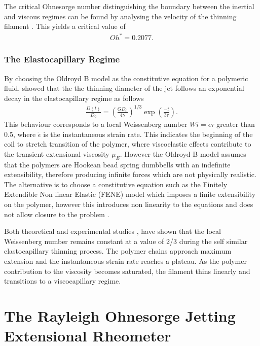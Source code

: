 \documentclass[11pt]{article}
\begin{document}
The critical Ohnesorge number distinguishing the boundary between the inertial and viscous regimes can be found by analysing the velocity of the thinning filament \cite{campo2010slow}. This yields a critical value of
\begin{align*}
Oh^* = 0.2077.
\end{align*}

\subsubsection{The Elastocapillary Regime} \label{sec:elasto}
By choosing the Oldroyd B model as the constitutive equation for a polymeric fluid, \cite{bazilevsky1990liquid} showed that the the thinning diameter of the jet follows an exponential decay in the elastocapillary regime as follows
\begin{align}
\frac{D(t)}{D_0} = \left(\frac{G D_0}{4 \gamma}\right)^{1/3} \exp \left(\frac{-t}{3 \tau}\right).
\label{eqn:elasto_thinning}
\end{align}
This behaviour corresponds to a local Weissenberg number $Wi = \dot{\epsilon} \tau$ greater than 0.5, where $\dot{\epsilon}$ is the instantaneous strain rate. This indicates the beginning of the coil to stretch transition of the polymer, where viscoelastic effects contribute to the transient extensional viscosity $\mu_E$. However the Oldroyd B model assumes that the polymers are Hookean bead spring dumbbells with an indefinite extensibility, therefore producing infinite forces which are not physically realistic. The alternative is to choose a constitutive equation such as the Finitely Extendible Non linear Elastic (FENE) model which imposes a finite extensibility on the polymer, however this introduces non linearity to the equations and does not allow closure to the problem \cite{entov1997effect}.

Both theoretical and experimental studies \citep{entov1997effect}, \citep{mckinley2005visco} have shown that the local Weissenberg number remains constant at a value of 2/3 during the self similar elastocapillary thinning process. The polymer chains approach maximum extension and the instantaneous strain rate reaches a plateau. As the polymer contribution to the viscosity becomes saturated, the filament thins linearly and transitions to a viscocapillary regime.

\newpage

\section{The Rayleigh Ohnesorge Jetting Extensional Rheometer}
\end{document}
